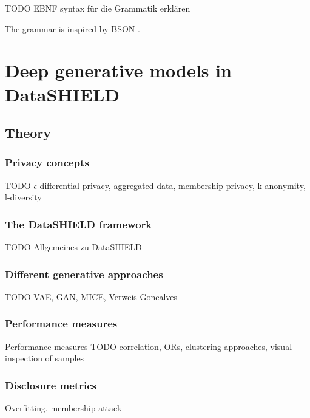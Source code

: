 \documentclass[12pt]{article}
\begin{document}
TODO EBNF syntax \citep{ebnf} für die Grammatik erklären

The grammar is inspired by BSON \citep{bsonspec}.





\FloatBarrier
\section{Deep generative models in DataSHIELD}



\subsection{Theory}

\subsubsection{Privacy concepts}
TODO $\epsilon$ differential privacy, aggregated data, membership privacy, k-anonymity, l-diversity

\subsubsection{The DataSHIELD framework}

TODO Allgemeines zu DataSHIELD

\subsubsection{Different generative approaches}
TODO VAE, GAN, MICE, Verweis Goncalves

\subsubsection{Performance measures}
Performance measures
TODO correlation, ORs, clustering approaches, visual inspection of samples

\subsubsection{Disclosure metrics}
Overfitting, membership attack
\end{document}
